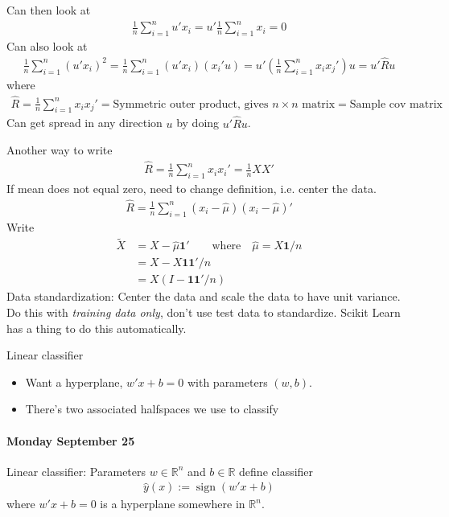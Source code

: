 \documentclass[12pt]{article}
\numberwithin{equation}{section} %
\theoremstyle{plain}
\theoremstyle{definition}
\theoremstyle{remark}
\newcommand{\R}{\mathbb{R}}
\newcommand{\sign}{\operatorname{sign}}
\newcommand{\sumin}{\sum^n_{i=1}}
\begin{document}
Can then look at
\begin{align*}
  \frac{1}{n}\sumin u'x_i
  =
  u'
  \frac{1}{n}\sumin x_i
  = 0
\end{align*}
Can also look at
\begin{align*}
  \frac{1}{n}\sumin (u'x_i)^2
  =
  \frac{1}{n}\sumin (u'x_i)(x_i'u)
  =
  u'
  \left(
  \frac{1}{n}\sumin x_ix_j'
  \right)
  u
  = u' \hat{R}u
\end{align*}
where
\begin{align*}
  \hat{R}
  =
  \frac{1}{n}\sumin x_ix_j'
  =
  \text{Symmetric outer product, gives $n\times n$ matrix}
  =
  \text{Sample cov matrix}
\end{align*}
Can get spread in any direction $u$ by doing $u'\hat{R}u$.

Another way to write
\begin{align*}
  \hat{R}
  =
  \frac{1}{n}\sumin x_ix_i'
  =
  \frac{1}{n}XX'
\end{align*}
If mean does not equal zero, need to change definition, i.e. center the
data.
\begin{align*}
  \hat{R}
  =
  \frac{1}{n}\sumin (x_i-\hat{\mu})(x_i-\hat{\mu})'
\end{align*}
Write
\begin{align*}
  \tilde{X}
  &=X-\hat{\mu}\mathbf{1}'
  \qquad\text{where}\quad
  \hat{\mu}=X\mathbf{1}/n
  \\
  &=X-X\mathbf{1}\mathbf{1}'/n
  \\
  &=X(I-\mathbf{1}\mathbf{1}'/n)
\end{align*}
Data standardization: Center the data and scale the data to have unit
variance. Do this with \emph{training data only}, don't use test data to
standardize.
Scikit Learn has a thing to do this automatically.

Linear classifier
\begin{itemize}
  \item Want a hyperplane, $w'x+b=0$ with parameters $(w,b)$.
  \item There's two associated halfspaces we use to classify
\end{itemize}


\clearpage
\paragraph{Monday September 25}

Linear classifier:
Parameters $w\in\R^n$ and $b\in\R$ define classifier
\begin{align*}
  \hat{y}(x) := \sign(w'x+b)
\end{align*}
where $w'x+b=0$ is a hyperplane somewhere in $\R^n$.
\end{document}
